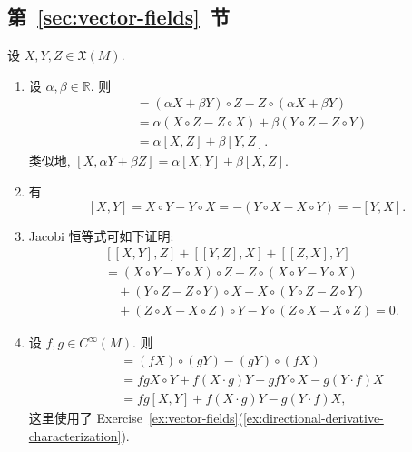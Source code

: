 \subsection{\texorpdfstring{第~\ref{sec:vector-fields}~节}{向量场}}\label{subsec:solutions-vector-fields}

\begin{description}[font=\normalfont,leftmargin=2em,labelwidth=1.5em]
设 $X,Y,Z\in\mathfrak{X}(M)$.
\begin{enumerate}[label=(\alph*),ref=\alph*,leftmargin=*]
\item 设 $\alpha,\beta\in\mathbb{R}$. 则
\begin{align*}
  [\alpha X+\beta Y,Z]&=(\alpha X+\beta Y)\circ Z-Z\circ(\alpha X+\beta Y)\\
  &=\alpha(X\circ Z-Z\circ X)+\beta(Y\circ Z-Z\circ Y)\\
  &=\alpha[X,Z]+\beta[Y,Z].
\end{align*}
类似地, $[X,\alpha Y+\beta Z]=\alpha[X,Y]+\beta[X,Z]$.
\item 有
\[
  [X,Y]=X\circ Y-Y\circ X=-(Y\circ X-X\circ Y)=-[Y,X].
\]
\item Jacobi 恒等式可如下证明:
\begin{align*}
  &[[X,Y],Z]+[[Y,Z],X]+[[Z,X],Y]\\
  &=(X\circ Y-Y\circ X)\circ Z-Z\circ(X\circ Y-Y\circ X)\\
  &\quad +(Y\circ Z-Z\circ Y)\circ X-X\circ(Y\circ Z-Z\circ Y)\\
  &\quad +(Z\circ X-X\circ Z)\circ Y-Y\circ(Z\circ X-X\circ Z)=0.
\end{align*}
\item 设 $f,g\in C^\infty(M)$. 则
\begin{align*}
  [fX,gY]&=(fX)\circ(gY)-(gY)\circ(fX)\\
  &=fgX\circ Y+f(X\cdot g)Y-gfY\circ X-g(Y\cdot f)X\\
  &=fg[X,Y]+f(X\cdot g)Y-g(Y\cdot f)X,
\end{align*}
这里使用了 Exercise~\ref{ex:vector-fields}(\ref{ex:directional-derivative-characterization}).
\end{enumerate}


\end{description}
